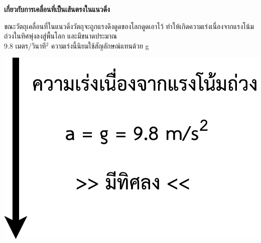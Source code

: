 \textbf{เกี่ยวกับการเคลื่อนที่เป็นเส้นตรงในแนวดิ่ง}
\tcblower 
\begin{minipage}{0.6\linewidth}
ขณะวัตถุเคลื่อนที่ในแนวดิ่งวัตถุจะถูกแรงดึงดูดของโลกดูดเอาไว้  ทำให้เกิดความเร่งเนื่องจากแรงโน้มถ่วงในทิศพุ่งลงสู่พื้นโลก \hfill และมีขนาดประมาณ  \\ 9.8  เมตร/วินาที$^2$  ความเร่งนี้นิยมใช้สัญลักษณ์แทนด้วย  g
\end{minipage}\hfill
\begin{adjustbox}{valign=c} \begin{minipage}[t]{.35\linewidth}
\includegraphics[width=\linewidth]{content-6.pdf}
\end{minipage}
\end{adjustbox}
